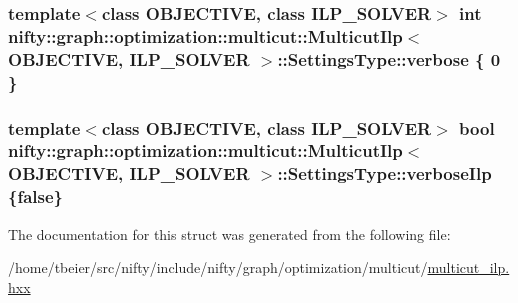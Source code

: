 \subsubsection[{verbose}]{\setlength{\rightskip}{0pt plus 5cm}template$<$class O\+B\+J\+E\+C\+T\+I\+V\+E, class I\+L\+P\+\_\+\+S\+O\+L\+V\+E\+R$>$ int {\bf nifty\+::graph\+::optimization\+::multicut\+::\+Multicut\+Ilp}$<$ O\+B\+J\+E\+C\+T\+I\+V\+E, I\+L\+P\+\_\+\+S\+O\+L\+V\+E\+R $>$\+::Settings\+Type\+::verbose \{ 0 \}}\label{structnifty_1_1graph_1_1optimization_1_1multicut_1_1MulticutIlp_1_1SettingsType_a1c0ea9bfda256cb0a8049944f9ff3163}
\hypertarget{structnifty_1_1graph_1_1optimization_1_1multicut_1_1MulticutIlp_1_1SettingsType_a21f5fd51ba414fc1ef13e42329072cb0}{}
\subsubsection[{verbose\+Ilp}]{\setlength{\rightskip}{0pt plus 5cm}template$<$class O\+B\+J\+E\+C\+T\+I\+V\+E, class I\+L\+P\+\_\+\+S\+O\+L\+V\+E\+R$>$ bool {\bf nifty\+::graph\+::optimization\+::multicut\+::\+Multicut\+Ilp}$<$ O\+B\+J\+E\+C\+T\+I\+V\+E, I\+L\+P\+\_\+\+S\+O\+L\+V\+E\+R $>$\+::Settings\+Type\+::verbose\+Ilp \{false\}}\label{structnifty_1_1graph_1_1optimization_1_1multicut_1_1MulticutIlp_1_1SettingsType_a21f5fd51ba414fc1ef13e42329072cb0}


The documentation for this struct was generated from the following file\+:\begin{DoxyCompactItemize}
\item 
/home/tbeier/src/nifty/include/nifty/graph/optimization/multicut/\hyperlink{multicut__ilp_8hxx}{multicut\+\_\+ilp.\+hxx}\end{DoxyCompactItemize}
